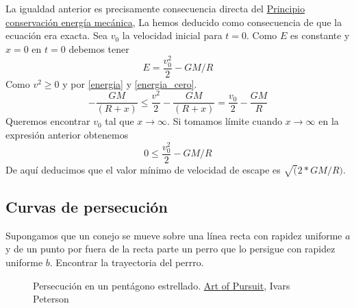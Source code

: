La igualdad anterior es precisamente  consecuencia directa del \href{https://docs.google.com/file/d/0B80iJ0HgObRRWll6MlJFSjFNMGc/edit}{Principio conservación energía mecánica},\link
La hemos deducido como consecuencia de que la ecuación era exacta. 
Sea $v_0$ la velocidad inicial para $t=0$. 
Como $E$ es constante y $x=0$ en $t=0$ debemos tener
\begin{equation}\label{energia_cero}
 E=\frac{v_0^2}{2}-GM/R
\end{equation}
Como $v^2\geq 0$ y por \eqref{energia} y \eqref{energia_cero}.
\[-\frac{GM}{(R+x)}\leq\frac{v^2}{2}-\frac{GM}{(R+x)}=\frac{v_0}{2}-\frac{GM}{R}\]
Queremos encontrar $v_0$ tal que $x\to\infty$. Si tomamos
límite cuando $x\to\infty$ en la expresión anterior obtenemos
\[0\leq \frac{v_0^2}{2}-GM/R\]
De aquí deducimos que el valor mínimo de velocidad de escape es 
$\sqrt(2*GM/R)$.

\subsection{Curvas de persecución}

\begin{problema} Supongamos que un conejo se mueve sobre una
línea recta con rapidez uniforme $a$ y de un punto por fuera de la recta parte un perro que lo
persigue con rapidez uniforme $b$. Encontrar la trayectoria del perrro.
\end{problema}







\begin{figure}[h]
\begin{center}
 \caption{\small Persecución en un pentágono estrellado.
\href{https://www.sciencenews.org/article/art-pursuit-3}{Art of Pursuit},
Ivars Peterson
}
\end{center}
\end{figure}



